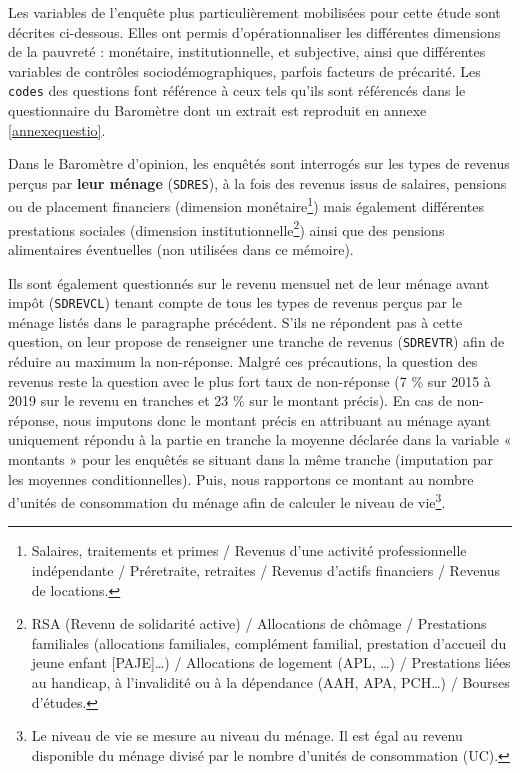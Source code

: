 \documentclass[12pt,a4paper]{reedthesis}
\begin{document}
Les variables de l'enquête plus particulièrement mobilisées pour cette étude sont décrites ci-dessous. Elles ont permis d'opérationnaliser les différentes dimensions de la pauvreté : monétaire, institutionnelle, et subjective, ainsi que différentes variables de contrôles sociodémographiques, parfois facteurs de précarité. Les \texttt{codes} des questions font référence à ceux tels qu'ils sont référencés dans le questionnaire du Baromètre dont un extrait est reproduit en annexe \ref{annexequestio}.

Dans le Baromètre d'opinion, les enquêtés sont interrogés sur les types de revenus perçus par \textbf{leur ménage} (\texttt{SDRES}), à la fois des revenus issus de salaires, pensions ou de placement financiers (dimension monétaire\footnote{Salaires, traitements et primes / Revenus d'une activité professionnelle indépendante / Préretraite, retraites / Revenus d'actifs financiers / Revenus de locations.}) mais également différentes prestations sociales (dimension institutionnelle\footnote{RSA (Revenu de solidarité active) / Allocations de chômage / Prestations familiales (allocations familiales, complément familial, prestation d'accueil du jeune enfant {[}PAJE{]}\ldots) / Allocations de logement (APL, \ldots) / Prestations liées au handicap, à l'invalidité ou à la dépendance (AAH, APA, PCH\ldots) / Bourses d'études.}) ainsi que des pensions alimentaires éventuelles (non utilisées dans ce mémoire).

Ils sont également questionnés sur le revenu mensuel net de leur ménage avant impôt (\texttt{SDREVCL}) tenant compte de tous les types de revenus perçus par le ménage listés dans le paragraphe précédent. S'ils ne répondent pas à cette question, on leur propose de renseigner une tranche de revenus (\texttt{SDREVTR}) afin de réduire au maximum la non-réponse. Malgré ces précautions, la question des revenus reste la question avec le plus fort taux de non-réponse (7 \% sur 2015 à 2019 sur le revenu en tranches et 23 \% sur le montant précis). En cas de non-réponse, nous imputons donc le montant précis en attribuant au ménage ayant uniquement répondu à la partie en tranche la moyenne déclarée dans la variable « montants » pour les enquêtés se situant dans la même tranche (imputation par les moyennes conditionnelles). Puis, nous rapportons ce montant au nombre d'unités de consommation du ménage afin de calculer le niveau de vie\footnote{Le niveau de vie se mesure au niveau du ménage. Il est égal au revenu disponible du ménage divisé par le nombre d'unités de consommation (UC).}.
\end{document}
